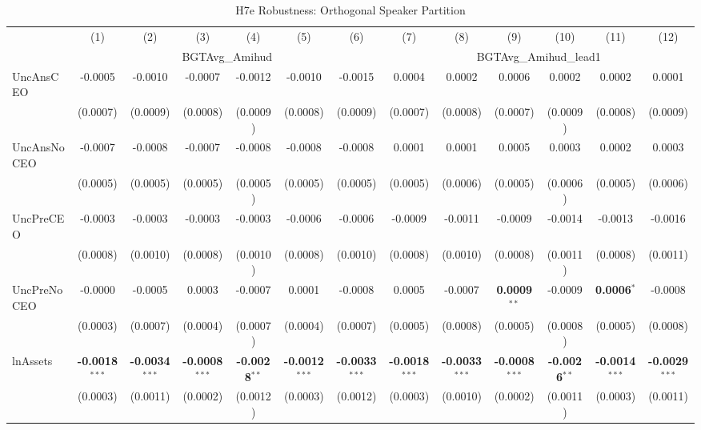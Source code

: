 \begin{landscape}
\begin{table}[H]
\setlength{\tabcolsep}{3pt}
\renewcommand{\arraystretch}{0.85}
\centering
\caption{H7e Robustness: Orthogonal Speaker Partition}
\label{tab:h7e_robust}
\scriptsize
\begin{tabular}{lcccccccccccc}
\toprule
 & (1) & (2) & (3) & (4) & (5) & (6) & (7) & (8) & (9) & (10) & (11) & (12) \\
 & \multicolumn{6}{c}{BGTAvg\_Amihud} & \multicolumn{6}{c}{BGTAvg\_Amihud\_lead1} \\
\cmidrule(lr){2-7} \cmidrule(lr){8-13}
\midrule
UncAnsCEO & -0.0005 & -0.0010 & -0.0007 & -0.0012 & -0.0010 & -0.0015 & 0.0004 & 0.0002 & 0.0006 & 0.0002 & 0.0002 & 0.0001 \\
 & (0.0007) & (0.0009) & (0.0008) & (0.0009) & (0.0008) & (0.0009) & (0.0007) & (0.0008) & (0.0007) & (0.0009) & (0.0008) & (0.0009) \\
UncAnsNoCEO & -0.0007 & -0.0008 & -0.0007 & -0.0008 & -0.0008 & -0.0008 & 0.0001 & 0.0001 & 0.0005 & 0.0003 & 0.0002 & 0.0003 \\
 & (0.0005) & (0.0005) & (0.0005) & (0.0005) & (0.0005) & (0.0005) & (0.0005) & (0.0006) & (0.0005) & (0.0006) & (0.0005) & (0.0006) \\
UncPreCEO & -0.0003 & -0.0003 & -0.0003 & -0.0003 & -0.0006 & -0.0006 & -0.0009 & -0.0011 & -0.0009 & -0.0014 & -0.0013 & -0.0016 \\
 & (0.0008) & (0.0010) & (0.0008) & (0.0010) & (0.0008) & (0.0010) & (0.0008) & (0.0010) & (0.0008) & (0.0011) & (0.0008) & (0.0011) \\
UncPreNoCEO & -0.0000 & -0.0005 & 0.0003 & -0.0007 & 0.0001 & -0.0008 & 0.0005 & -0.0007 & \textbf{0.0009}$^{**}$ & -0.0009 & \textbf{0.0006}$^{*}$ & -0.0008 \\
 & (0.0003) & (0.0007) & (0.0004) & (0.0007) & (0.0004) & (0.0007) & (0.0005) & (0.0008) & (0.0005) & (0.0008) & (0.0005) & (0.0008) \\
\midrule
lnAssets & \textbf{-0.0018}$^{***}$ & \textbf{-0.0034}$^{***}$ & \textbf{-0.0008}$^{***}$ & \textbf{-0.0028}$^{**}$ & \textbf{-0.0012}$^{***}$ & \textbf{-0.0033}$^{***}$ & \textbf{-0.0018}$^{***}$ & \textbf{-0.0033}$^{***}$ & \textbf{-0.0008}$^{***}$ & \textbf{-0.0026}$^{**}$ & \textbf{-0.0014}$^{***}$ & \textbf{-0.0029}$^{***}$ \\
 & (0.0003) & (0.0011) & (0.0002) & (0.0012) & (0.0003) & (0.0012) & (0.0003) & (0.0010) & (0.0002) & (0.0011) & (0.0003) & (0.0011) \\

\end{tabular}
\end{table}
\end{landscape}
